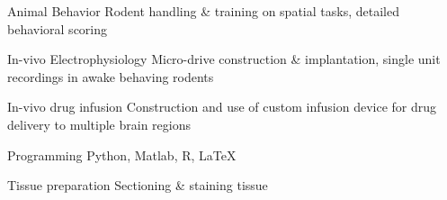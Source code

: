 

\begin{cvskills}

  \cvskill
    {Animal Behavior} %
    {Rodent handling \& training on spatial tasks, detailed behavioral scoring} %

  \cvskill
    {In-vivo Electrophysiology} %
    {Micro-drive construction \& implantation, single unit recordings in awake behaving rodents} %

  \cvskill
    {In-vivo drug infusion} %
    {Construction and use of custom infusion device for drug delivery to multiple brain regions} %

  \cvskill
    {Programming} %
    {Python, Matlab, R, \LaTeX} %

  \cvskill
    {Tissue preparation} %
    {Sectioning \& staining tissue} %

\end{cvskills}




